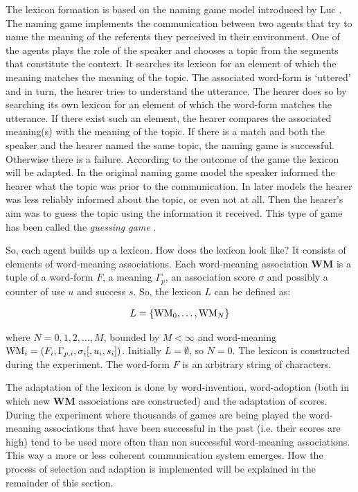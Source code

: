 The lexicon formation is based on the naming game model introduced by Luc . The naming game implements the communication between two agents that try to name the meaning of the referents they perceived in their environment. One of the agents plays the role of the speaker and chooses a topic from the segments that constitute the context. It searches its lexicon for an element of which the meaning matches the meaning of the topic. The associated word-form is `uttered' and in turn, the hearer tries to understand the utterance. The hearer does so by searching its own lexicon for an element of which the word-form matches the utterance. If there exist such an element, the hearer compares the associated meaning(s) with the meaning of the topic. If there is a match and both the speaker and the hearer named the same topic, the naming game is successful. Otherwise there is a failure. According to the outcome of the game the lexicon will be adapted. In the original naming game model the speaker informed the hearer what the topic was prior to the communication. In later models the hearer was less reliably informed about the topic, or even not at all. Then the hearer's aim was to guess the topic using the information it received. This type of game has been called the {\em guessing game} \cite{steelskaplan:1999}.

\p
So, each agent builds up a lexicon. How does the lexicon look like? It consists of elements of word-meaning associations. Each word-meaning association {\bf WM} is a tuple of a word-form $F$, a meaning $\Gamma_p$, an association score $\sigma$ and possibly a counter of use $u$ and success $s$. So, the lexicon $L$ can be defined as:

\begin{eqnarray}
L=\{{\bf \mbox{WM}}_0, \ldots, {\bf \mbox{WM}}_N\}
\end{eqnarray}

\noindent
where $N=0,1,2,\ldots,M$, bounded by $M<\infty$ and word-meaning ${\bf \mbox{WM}}_i=(F_i,\Gamma_{p,i},\sigma_i[,u_i,s_i])$. Initially $L=\emptyset$, so $N=0$. The lexicon is constructed during the experiment. The word-form $F$ is an arbitrary string of characters. 

\p
The adaptation of the lexicon is done by word-invention, word-adoption (both in which new {\bf WM} associations are constructed) and the adaptation of scores. During the experiment where thousands of games are being played the word-meaning associations that have been successful in the past (i.e. their scores are high) tend to be used more often than non successful word-meaning associations. This way a more or less coherent communication system emerges. How the process of selection and adaption is implemented will be explained in the remainder of this section.


